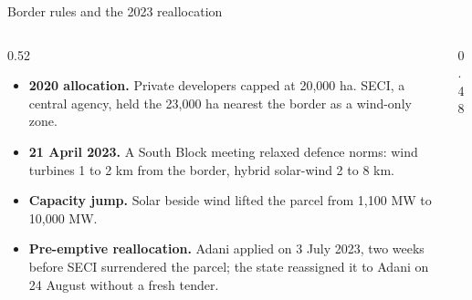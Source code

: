 \documentclass[10pt,aspectratio=169]{beamer}
\newcommand{\dia}[2]{\resizebox{!}{#2}{}}      %
\newcommand{\diaw}[2]{\resizebox{#2}{!}{}}     %
\newenvironment{pts}{\begin{itemize}\footnotesize\setlength{\itemsep}{3pt}}{\end{itemize}}
\begin{document}
\begin{frame}[t]{Border rules and the 2023 reallocation}
  \begin{columns}[T]
    \begin{column}{0.52\textwidth}
      \begin{pts}
        \item \textbf{2020 allocation.} Private developers capped at 20,000 ha. SECI, a central agency, held the 23,000 ha nearest the border as a wind-only zone.
        \item \textbf{21 April 2023.} A South Block meeting relaxed defence norms: wind turbines 1 to 2 km from the border, hybrid solar-wind 2 to 8 km.
        \item \textbf{Capacity jump.} Solar beside wind lifted the parcel from 1,100 MW to 10,000 MW.
        \item \textbf{Pre-emptive reallocation.} Adani applied on 3 July 2023, two weeks before SECI surrendered the parcel; the state reassigned it to Adani on 24 August without a fresh tender.
      \end{pts}
    \end{column}
    \begin{column}{0.48\textwidth}
      \centering\dia{d05_border_zones}{3.2cm}
    \end{column}
  \end{columns}
  \vspace{1mm}
  \centering\diaw{d05_timeline}{0.9\textwidth}
\end{frame}
\end{document}

